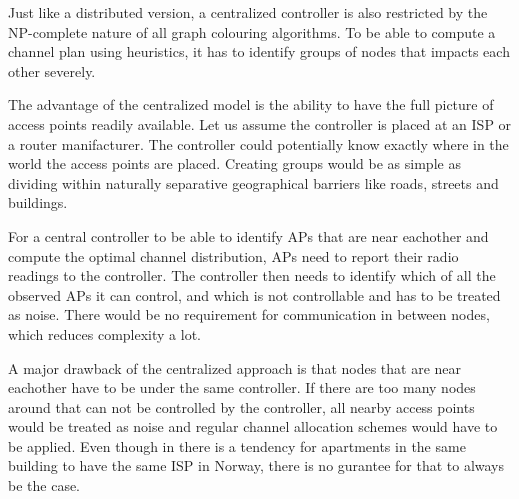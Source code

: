 Just like a distributed version, a centralized controller is also restricted by the NP-complete nature of all graph colouring algorithms.
To be able to compute a channel plan using heuristics, it has to identify groups of nodes that impacts each other severely. 

The advantage of the centralized model is the ability to have the full picture of access points readily available. Let us assume the controller is placed at an ISP or a router manifacturer.
The controller could potentially know exactly where in the world the access points are placed. Creating groups would be as simple as dividing within naturally separative geographical barriers like roads, streets and buildings. 

For a central controller to be able to identify APs that are near eachother and compute the optimal channel distribution, APs need to report their radio readings to the controller. 
The controller then needs to identify which of all the observed APs it can control, and which is not controllable and has to be treated as noise. There would be no requirement for
communication in between nodes, which reduces complexity a lot.  

A major drawback of the centralized approach is that nodes that are near eachother have to be under the same controller. If there are too many nodes around
that can not be controlled by the controller, all nearby access points would be treated as noise and regular channel allocation schemes would have to be applied.
Even though in there is a tendency for apartments in the same building to have the same ISP in Norway, there is no gurantee for that to always be the case.  

